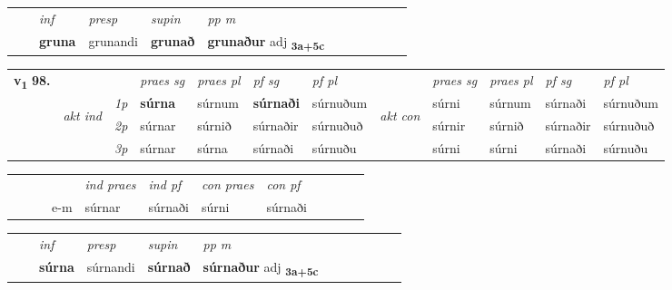 \begin{tabular}{llllllllllll}
 & & \textit{inf}     & \textit{presp} & \textit{supin}  & \textit{pp m}     \\*
  & & \textbf{gruna}      & grunandi &  \textbf{grunað}  & \textbf{grunaður} adj \textbf{\textsubscript{3a+5c}} \\*
\cmidrule{1-12}
\end{tabular}



\begin{tabular}{llllllllllll} \toprule
\multirow{4}{*}{{{\textbf{v{\textsubscript{1}}} \Large{\textbf{98.}}}}}  & &   &  \textit{praes sg}  & \textit{praes pl}  &\textit{ pf sg} & \textit{pf pl} &  &  \textit{praes sg}  & \textit{praes pl}  & \textit{pf sg} & \textit{pf pl } \\*
	\cmidrule{4-7} \cmidrule{9-12}
 & \multirow{3}{*}{\begin{turn}{90}\textit{akt ind}\end{turn}} & {\textit{1p}} & \textbf{súrna} & súrnum    & \textbf{súrnaði} & súrnuðum & \multirow{3}{*}{\begin{turn}{90}\textit{akt con}\end{turn}} &súrni & súrnum & súrnaði & súrnuðum\\*
& &  {\textit{2p}} &  súrnar  & súrnið   & súrnaðir & súrnuðuð & & súrnir & súrnið & súrnaðir & súrnuðuð \\*
& &  {\textit{3p}} & súrnar & súrna   & súrnaði & súrnuðu & & súrni & súrni& súrnaði & súrnuðu  \\*
\cmidrule{4-7} \cmidrule{9-12}
\end{tabular}


\begin{tabular}{llllllllllll}
 & &  & &  \textit{ind praes} & \textit{ind pf} & \textit{con praes} & \textit{con pf} \\*
&  & & e-m & súrnar & súrnaði & súrni & súrnaði \\*
\cmidrule{5-9}
\end{tabular}


\begin{tabular}{llllllllllll}
 & & \textit{inf}     & \textit{presp} & \textit{supin}  & \textit{pp m}     \\*
  & & \textbf{súrna}      & súrnandi &  \textbf{súrnað}  & \textbf{súrnaður} adj \textbf{\textsubscript{3a+5c}} \\*
\cmidrule{1-12}
\end{tabular}



